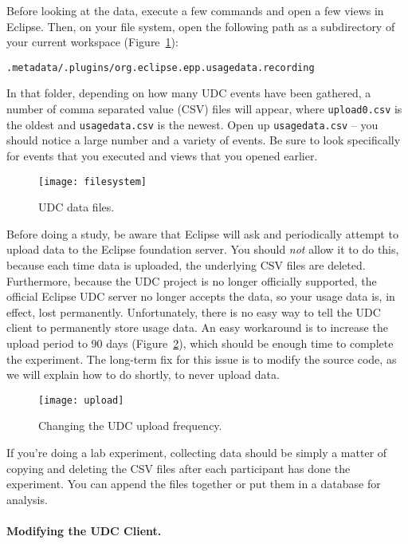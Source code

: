 Before looking at the data, execute a few commands and open a few views 
in Eclipse.
Then, on your file system, open the following path as a subdirectory
of your current workspace (Figure~\ref{fig:filesystem}): 

\vspace{4mm}
\texttt{.metadata/.plugins/org.eclipse.epp.usagedata.recording}
\vspace{4mm}

\noindent
In that folder, depending on how many UDC events have been gathered,
a number of comma separated value (CSV) files will appear, where \texttt{upload0.csv} is the oldest
and \texttt{usagedata.csv} is the newest.
Open up \texttt{usagedata.csv} -- you should notice a large number and a variety of events.
Be sure to look specifically for events that you executed and views that you opened earlier.

\begin{figure}
  \centering
  \texttt{[image: filesystem]}
  \caption{UDC data files.}\label{fig:filesystem}
\end{figure}

Before doing a study, be aware that Eclipse will ask and periodically attempt to upload
data to the Eclipse foundation server.
You should \emph{not} allow it to do this, because each time data is uploaded, the underlying
CSV files are deleted.
Furthermore, because the UDC project is no longer officially supported, the official Eclipse
UDC server no longer accepts the data, so your usage data is, in effect, lost permanently.
Unfortunately, there is no easy way to tell the UDC client to permanently store
usage data.
An easy workaround is to increase the upload period to 90 days (Figure~\ref{fig:upload}),
which should be enough time to complete the experiment.
The long-term fix for this issue is to modify the source code, as we will explain
how to do shortly, to never upload data.

\begin{figure}
  \centering
  \texttt{[image: upload]}
  \caption{Changing the UDC upload frequency.}\label{fig:upload}
\end{figure}

If you're doing a lab experiment, collecting data should be simply a matter of
copying and deleting the CSV files after each participant has done the experiment.
You can append the files together or put them in a database for analysis.

\paragraph{Modifying the UDC Client.}

